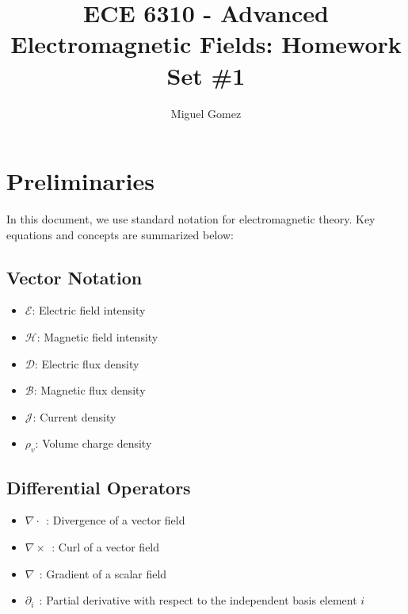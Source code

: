 \documentclass[12pt]{article}
\newcommand{\TimeUntilDue}{
  \ifnum\daystilldue<4
    \textcolor{red}{
    \number\daystilldue\ days - 
    \number\hourstilldue\ hours - 
    \number\minutestilldue\ min until deadline!!
  }
\else
    \number\daystilldue\ days - 
    \number\hourstilldue\ hours - 
    \number\minutestilldue\ min until deadline
  \fi
}
\begin{document}
\title{ECE 6310 - Advanced Electromagnetic Fields: Homework Set \#1}
\author{Miguel Gomez}
\maketitle

\section{Preliminaries}

In this document, we use standard notation for electromagnetic theory. Key equations and concepts are summarized below:

\subsection*{Vector Notation}
\begin{itemize}
  \item $\bm{\mathcal{E}}$: Electric field intensity
  \item $\bm{\mathcal{H}}$: Magnetic field intensity
  \item $\bm{\mathcal{D}}$: Electric flux density
  \item $\bm{\mathcal{B}}$: Magnetic flux density
  \item $\bm{\mathcal{J}}$: Current density
  \item $\rho_v$: Volume charge density
\end{itemize}

\subsection*{Differential Operators}
\begin{itemize}
  \item $\nabla \cdot\ \ $: Divergence of a vector field
  \item $\nabla \times\ \ $: Curl of a vector field
  \item $\nabla\ \ $: Gradient of a scalar field
  \item $\partial_i\ \ $: Partial derivative with respect to the independent basis element $i$
\end{itemize}
\end{document}
